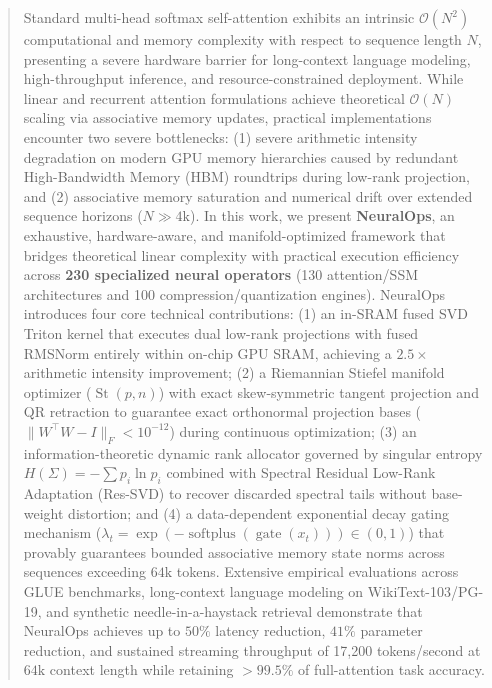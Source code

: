\begin{abstract}
Standard multi-head softmax self-attention exhibits an intrinsic $\mathcal{O}(N^2)$ computational and memory complexity with respect to sequence length $N$, presenting a severe hardware barrier for long-context language modeling, high-throughput inference, and resource-constrained deployment. While linear and recurrent attention formulations achieve theoretical $\mathcal{O}(N)$ scaling via associative memory updates, practical implementations encounter two severe bottlenecks: (1) severe arithmetic intensity degradation on modern GPU memory hierarchies caused by redundant High-Bandwidth Memory (HBM) roundtrips during low-rank projection, and (2) associative memory saturation and numerical drift over extended sequence horizons ($N \gg 4\text{k}$). In this work, we present \textbf{NeuralOps}, an exhaustive, hardware-aware, and manifold-optimized framework that bridges theoretical linear complexity with practical execution efficiency across \textbf{230 specialized neural operators} (130 attention/SSM architectures and 100 compression/quantization engines). NeuralOps introduces four core technical contributions: (1) an in-SRAM fused SVD Triton kernel that executes dual low-rank projections with fused RMSNorm entirely within on-chip GPU SRAM, achieving a $2.5\times$ arithmetic intensity improvement; (2) a Riemannian Stiefel manifold optimizer ($\operatorname{St}(p, n)$) with exact skew-symmetric tangent projection and QR retraction to guarantee exact orthonormal projection bases ($\|W^\top W - I\|_F < 10^{-12}$) during continuous optimization; (3) an information-theoretic dynamic rank allocator governed by singular entropy $H(\Sigma) = -\sum p_i \ln p_i$ combined with Spectral Residual Low-Rank Adaptation (Res-SVD) to recover discarded spectral tails without base-weight distortion; and (4) a data-dependent exponential decay gating mechanism ($\lambda_t = \exp(-\operatorname{softplus}(\operatorname{gate}(x_t))) \in (0, 1)$) that provably guarantees bounded associative memory state norms across sequences exceeding $64\text{k}$ tokens. Extensive empirical evaluations across GLUE benchmarks, long-context language modeling on WikiText-103/PG-19, and synthetic needle-in-a-haystack retrieval demonstrate that NeuralOps achieves up to $50\%$ latency reduction, $41\%$ parameter reduction, and sustained streaming throughput of 17,200 tokens/second at $64\text{k}$ context length while retaining $>99.5\%$ of full-attention task accuracy.
\end{abstract}
